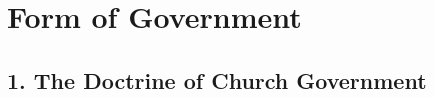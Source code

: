 \documentclass[
]{book}
\begin{document}
\hypertarget{form-of-government}{%
\chapter*{Form of Government}\label{form-of-government}}

\hypertarget{the-doctrine-of-church-government}{%
\section*{1. The Doctrine of Church Government}\label{the-doctrine-of-church-government}}

\protect\hypertarget{part-main-body-2}{\href{}{}}
\protect\hypertarget{chapter-slug-1-the-doctrine-of-church-government}{\href{}{}}
\end{document}
